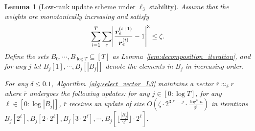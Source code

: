 \documentclass[11pt]{article}
\newtheorem{lemma}[theorem]{Lemma}
\let\originalleft\left
\let\originalright\right
\renewcommand{\left}{\mathopen{}\mathclose\bgroup\originalleft}
\renewcommand{\right}{\aftergroup\egroup\originalright}
\newcommand\rr{\boldsymbol{\mathit{r}}}
\newcommand\rrbar{\overline{\boldsymbol{\mathit{r}}}}
\begin{document}
\begin{lemma}[Low-rank update scheme under $\ell_3$ stability]\label{lem:LowRankL3}
Assume that the weights are monotonically increasing and satisfy 
\[
\sum_{i=1}^T \sum_{e} \left|\frac{\rr_e^{\left(i + 1\right)}}{\rr_e^{\left(i \right)}} - 1 \right|^3 \leq \zeta. 
\]
Define the sets $B_0, \cdots, B_{\log T} \subseteq [T]$ as Lemma~\ref{lem:decomposition_iteration}, and for any $j$ let $B_j[1], \cdots, B_j[|B_j|]$ denote the elements in $B_j$ in increasing order. 

For any $\delta \leq 0.1$, Algorithm~\ref{alg:select_vector_L3} maintains a vector $\rrbar \approx_{\delta} \rr$ where $\rrbar$ undergoes the following updates: for any $j \in [0: \log T]$, for any $\ell \in [0: \log |B_j|]$, $\rrbar$ receives an update of size $O(\zeta \cdot 2^{3 \ell-j} \cdot \frac{\log^6 n}{\delta^3})$ in iterations $B_j[2^{\ell}], B_j[2 \cdot 2^{\ell}], B_j[3 \cdot 2^{\ell}], \cdots, B_j[\lfloor \frac{|B_j|}{2^{\ell}} \rfloor \cdot 2^{\ell}]$.
\end{lemma}
\end{document}
